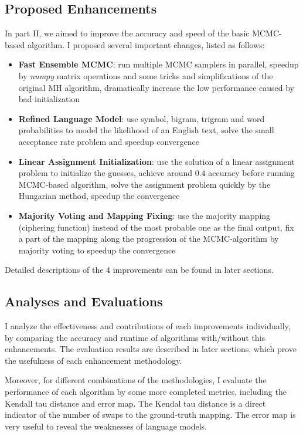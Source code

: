 \documentclass[10pt, twocolumn]{article}
\begin{document}
\subsection{Proposed Enhancements}
In part II, we aimed to improve the accuracy and speed of the basic MCMC-based algorithm. I proposed several important changes, listed as follows:
\begin{itemize}
	\item \textbf{Fast Ensemble MCMC}: run multiple MCMC samplers in parallel, speedup by \textit{numpy} matrix operations and some tricks and simplifications of the original MH algorithm, dramatically increase the low performance caused by bad initialization
	\item \textbf{Refined Language Model}: use symbol, bigram, trigram and word probabilities to model the likelihood of an English text, solve the small acceptance rate problem and speedup convergence
	\item \textbf{Linear Assignment Initialization}: use the solution of a linear assignment problem to initialize the guesses, achieve around $0.4$ accuracy before running MCMC-based algorithm, solve the assignment problem quickly by the Hungarian method, speedup the convergence
	\item \textbf{Majority Voting and Mapping Fixing}: use the majority mapping (ciphering function) instead of the most probable one as the final output, fix a part of the mapping along the progression of the MCMC-algorithm by majority voting to speedup the convergence
\end{itemize}
Detailed descriptions of the 4 improvements can be found in later sections.

\subsection{Analyses and Evaluations}
I analyze the effectiveness and contributions of each improvements individually, by comparing the accuracy and runtime of algorithms with/without this enhancements. The evaluation results are described in later sections, which prove the usefulness of each enhancement methodology.

Moreover, for different combinations of the methodologies, I evaluate the performance of each algorithm by some more completed metrics, including the Kendall tau distance and error map. The Kendal tau distance is a direct indicator of the number of swaps to the ground-truth mapping. The error map is very useful to reveal the weaknesses of language models.
\end{document}
